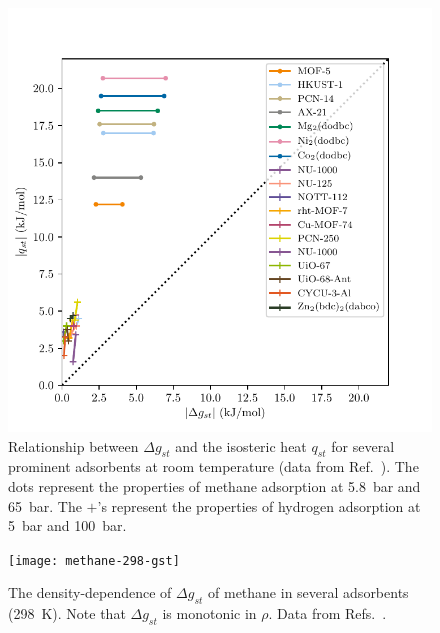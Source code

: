 \documentclass[pre,twocolumn]{revtex4-2}
\newcommand\gst{\ensuremath{\Delta g_{st}}}
\begin{document}
\begin{figure}
    \centering
    \includegraphics[width=0.95\columnwidth]{qst-vs-delta-G}
    \caption{Relationship between $\gst$ and the isosteric heat
      $q_{st}$ for several prominent adsorbents at room
      temperature (data from Ref.~\cite{mason2014evaluating, garcia2018benchmark}). The dots represent the properties of methane
      adsorption at 5.8~bar and 65~bar. The $+$'s represent the
      properties of hydrogen adsorption at 5~bar and
      100~bar.}
    \label{fig:qst-vs-delta-G}
\end{figure}

\begin{figure}
    \centering
    \texttt{[image: methane-298-gst]}
    \caption{The density-dependence of $\gst$ of methane in several
      adsorbents (298\ K). Note that $\gst$ is monotonic in
      $\rho$. Data from
      Refs.~\cite{mason2014evaluating, furukawa2009storage}.
    }
    \label{fig:methane-gst}
\end{figure}
\end{document}
